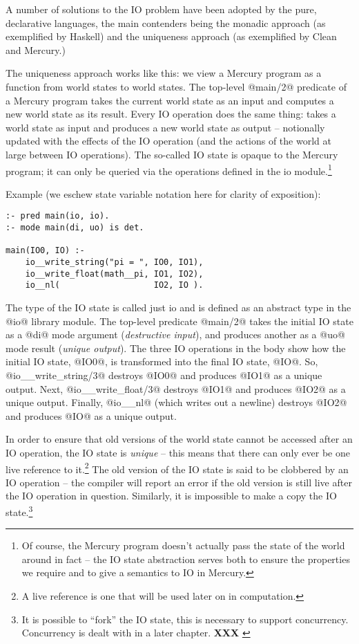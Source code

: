 \documentclass[a4paper,11pt,notitlepage,onecolumn]{article}
\newcommand{\XXX}[1]%
{{\small\textbf{XXX} \emph{#1}}}
\begin{document}
A number of solutions to the IO problem have been adopted by
the pure, declarative languages, the main contenders being the
monadic approach (as exemplified by Haskell) and the
uniqueness approach (as exemplified by Clean and Mercury.)

The uniqueness approach works like this: we view a Mercury
program as a function from world states to world states.  The
top-level @main/2@ predicate of a Mercury program takes the
current world state as an input and computes a new world state
as its result.  Every IO operation does the same thing: takes
a world state as input and produces a new world state as
output -- notionally updated with the effects of the IO
operation (and the actions of the world at large between IO
operations).  The so-called IO state is opaque to the Mercury
program; it can only be queried via the operations defined in
the io module.\footnote{Of course, the Mercury program doesn't actually
pass the state of the world around in fact -- the IO state
abstraction serves both to ensure the properties we require
and to give a semantics to IO in Mercury.}

Example (we eschew state variable notation here for clarity of
exposition):
\begin{verbatim}
:- pred main(io, io).
:- mode main(di, uo) is det.

main(IO0, IO) :-
    io__write_string("pi = ", IO0, IO1),
    io__write_float(math__pi, IO1, IO2),
    io__nl(                   IO2, IO ).
\end{verbatim}
The type of the IO state is called just io and is defined
as an abstract type in the @io@ library module.  The
top-level predicate @main/2@ takes the initial IO state as a
@di@ mode argument (\emph{destructive input}), and produces another as a
@uo@ mode result (\emph{unique output}).  The three IO operations in the body
show how the initial IO state, @IO0@, is transformed into
the final IO state, @IO@.  So, @io__write_string/3@ destroys
@IO0@ and produces @IO1@ as a unique output.  Next,
@io__write_float/3@ destroys @IO1@ and produces @IO2@ as a
unique output.  Finally, @io__nl@ (which writes out a
newline) destroys @IO2@ and produces @IO@ as a unique output.

In order to ensure that old versions of the world state cannot
be accessed after an IO operation, the IO state is \emph{unique} --
this means that there can only ever be one live reference to
it.\footnote{A live reference is one that will be used
later on in computation.}  The old version of the IO state
is said to be clobbered by an IO operation -- the compiler will
report an error if the old version is still live after the IO
operation in question.  Similarly, it is impossible to make a
copy the IO state.\footnote{It is possible to ``fork'' the IO
state, this is necessary to support concurrency.  Concurrency
is dealt with in a later chapter. \XXX{}}
\end{document}
